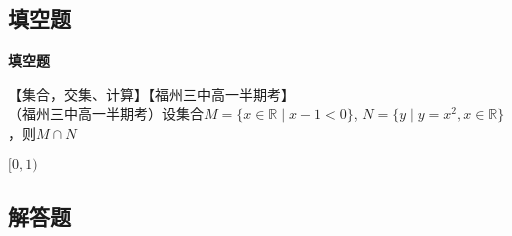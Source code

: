   \subsection{填空题}
  \begin{exercise}{\bf 填空题}
    \item 【集合，交集、计算】【福州三中高一半期考】\\
      （福州三中高一半期考）设集合$M=\{x\in \mathbb{R}\mid x-1<0 \} $, $N=\{y\mid y=x^2,x\in\mathbb{R} \} $，则$M\cap N$\tk
      \begin{answer}
        $[0,1)$
      \end{answer}
  \end{exercise}
  \subsection{解答题}
